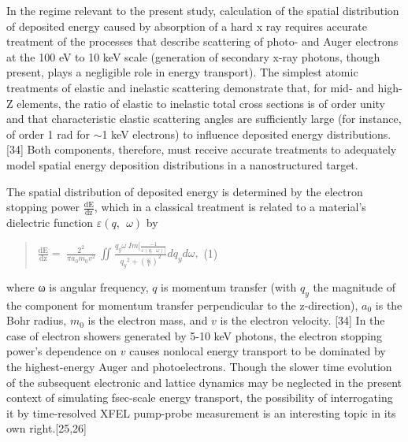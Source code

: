 In the regime relevant to the present study, calculation of the spatial
distribution of deposited energy caused by absorption of a hard x ray
requires accurate treatment of the processes that describe scattering of
photo- and Auger electrons at the 100 eV to 10 keV scale (generation of
secondary x-ray photons, though present, plays a negligible role in
energy transport). The simplest atomic treatments of elastic and
inelastic scattering demonstrate that, for mid- and high-Z elements, the
ratio of elastic to inelastic total cross sections is of order unity and
that characteristic elastic scattering angles are sufficiently large
(for instance, of order 1 rad for $\sim$1 keV electrons) to
influence deposited energy distributions. {[}34{]} Both components,
therefore, must receive accurate treatments to adequately model spatial
energy deposition distributions in a nanostructured target.

The spatial distribution of deposited energy is determined by the
electron stopping power \(\frac{\text{dE}}{\text{dz}}\), which in a
classical treatment is related to a material's dielectric function
\(\varepsilon(q,\ \ \omega)\) by

\begin{quote}
\(\frac{\text{dE}}{\text{dz}} = \ \frac{2^{2}}{\pi a_{0}m_{0}v^{2}}\ \iint_{}^{}\frac{q_{y}\omega\ Im\lbrack\frac{- 1}{\varepsilon(q,\ \ \omega)\rbrack}}{{q_{y}}^{2} + \left( \frac{\omega}{v} \right)^{2}}dq_{y}d\omega,\)
(1)
\end{quote}

where ω is angular frequency, \(q\) is momentum transfer (with \(q_{y}\)
the magnitude of the component for momentum transfer perpendicular to
the z-direction), \(a_{0}\) is the Bohr radius, \(m_{0}\) is the
electron mass, and \(v\) is the electron velocity. {[}34{]} In the case
of electron showers generated by 5-10 keV photons, the electron stopping
power's dependence on \(v\) causes nonlocal energy transport to be
dominated by the highest-energy Auger and photoelectrons. Though the
slower time evolution of the subsequent electronic and lattice dynamics
may be neglected in the present context of simulating fsec-scale energy
transport, the possibility of interrogating it by time-resolved XFEL
pump-probe measurement is an interesting topic in its own
right.{[}25,26{]}

